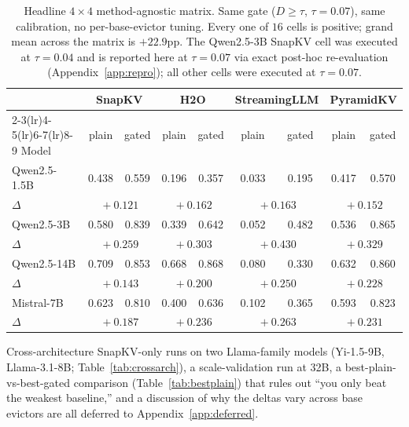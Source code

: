 \documentclass{article}
\begin{document}
\begin{table}[t]
\centering
\caption{Headline $4 \times 4$ method-agnostic matrix. Same gate ($D \ge \tau$,
$\tau = 0.07$), same calibration, no per-base-evictor tuning. Every one of $16$
cells is positive; grand mean across the matrix is $+22.9$pp. The Qwen2.5-3B
SnapKV cell was executed at $\tau = 0.04$ and is reported here at
$\tau = 0.07$ via exact post-hoc re-evaluation (Appendix~\ref{app:repro});
all other cells were executed at $\tau = 0.07$.}
\label{tab:matrix}
\begin{tabular}{lcccccccc}
\toprule
 & \multicolumn{2}{c}{SnapKV} & \multicolumn{2}{c}{H2O} & \multicolumn{2}{c}{StreamingLLM} & \multicolumn{2}{c}{PyramidKV} \\
\cmidrule(lr){2-3}\cmidrule(lr){4-5}\cmidrule(lr){6-7}\cmidrule(lr){8-9}
Model & plain & gated & plain & gated & plain & gated & plain & gated \\
\midrule
Qwen2.5-1.5B & 0.438 & 0.559 & 0.196 & 0.357 & 0.033 & 0.195 & 0.417 & 0.570 \\
$\Delta$      & \multicolumn{2}{c}{$\!+\!0.121$} & \multicolumn{2}{c}{$\!+\!0.162$} & \multicolumn{2}{c}{$\!+\!0.163$} & \multicolumn{2}{c}{$\!+\!0.152$} \\
\midrule
Qwen2.5-3B   & 0.580 & 0.839 & 0.339 & 0.642 & 0.052 & 0.482 & 0.536 & 0.865 \\
$\Delta$      & \multicolumn{2}{c}{$\!+\!0.259$} & \multicolumn{2}{c}{$\!+\!0.303$} & \multicolumn{2}{c}{$\!+\!0.430$} & \multicolumn{2}{c}{$\!+\!0.329$} \\
\midrule
Qwen2.5-14B  & 0.709 & 0.853 & 0.668 & 0.868 & 0.080 & 0.330 & 0.632 & 0.860 \\
$\Delta$      & \multicolumn{2}{c}{$\!+\!0.143$} & \multicolumn{2}{c}{$\!+\!0.200$} & \multicolumn{2}{c}{$\!+\!0.250$} & \multicolumn{2}{c}{$\!+\!0.228$} \\
\midrule
Mistral-7B    & 0.623 & 0.810 & 0.400 & 0.636 & 0.102 & 0.365 & 0.593 & 0.823 \\
$\Delta$      & \multicolumn{2}{c}{$\!+\!0.187$} & \multicolumn{2}{c}{$\!+\!0.236$} & \multicolumn{2}{c}{$\!+\!0.263$} & \multicolumn{2}{c}{$\!+\!0.231$} \\
\bottomrule
\end{tabular}
\end{table}

Cross-architecture SnapKV-only runs on two Llama-family models
(Yi-1.5-9B, Llama-3.1-8B; Table~\ref{tab:crossarch}), a scale-validation
run at 32B, a best-plain-vs-best-gated comparison
(Table~\ref{tab:bestplain}) that rules out ``you only beat the weakest
baseline,'' and a discussion of why the deltas vary across base evictors
are all deferred to Appendix~\ref{app:deferred}.
\end{document}
